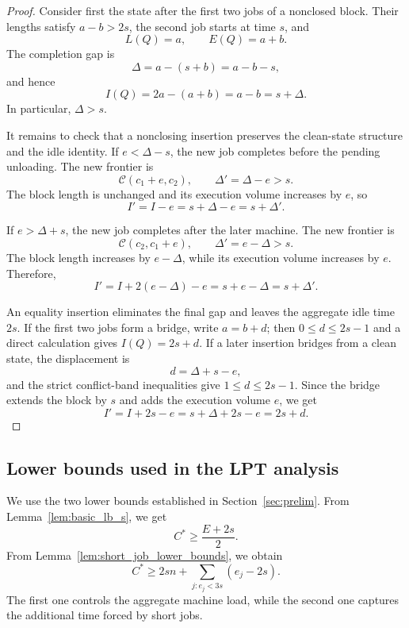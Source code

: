 \documentclass[11pt]{article}
\begin{document}
\begin{proof}
Consider first the state after the first two jobs of a nonclosed block. Their
lengths satisfy \(a-b>2s\), the second job starts at time \(s\), and
\[
L(Q)=a,\qquad E(Q)=a+b.
\]
The completion gap is
\[
\Delta=a-(s+b)=a-b-s,
\]
and hence
\[
I(Q)=2a-(a+b)=a-b=s+\Delta.
\]
In particular, \(\Delta>s\).

It remains to check that a nonclosing insertion preserves the clean-state
structure and the idle identity. If \(e<\Delta-s\), the new job completes
before the pending unloading. The new frontier is
\[
\mathcal C(c_1+e,c_2),
\qquad
\Delta'=\Delta-e>s.
\]
The block length is unchanged and its execution volume increases by \(e\), so
\[
I'=I-e=s+\Delta-e=s+\Delta'.
\]

If \(e>\Delta+s\), the new job completes after the later machine. The new
frontier is
\[
\mathcal C(c_2,c_1+e),
\qquad
\Delta'=e-\Delta>s.
\]
The block length increases by \(e-\Delta\), while its execution volume
increases by \(e\). Therefore,
\[
I'=I+2(e-\Delta)-e=s+e-\Delta=s+\Delta'.
\]

An equality insertion eliminates the final gap and leaves the aggregate idle time
\(2s\). If the first two jobs form a bridge, write \(a=b+d\); then
\(0\le d\le2s-1\) and a direct calculation gives \(I(Q)=2s+d\). If a later
insertion bridges from a clean state, the displacement is
\[
d=\Delta+s-e,
\]
and the strict conflict-band inequalities give \(1\le d\le2s-1\). Since the
bridge extends the block by \(s\) and adds the execution volume \(e\), we get
\[
I'=I+2s-e=s+\Delta+2s-e=2s+d.
\]
\end{proof}

\subsection{Lower bounds used in the LPT analysis}
\label{subsec:lpt-lower-bounds}

We use the two lower bounds established in Section~\ref{sec:prelim}. From
Lemma~\ref{lem:basic_lb_s}, we get
\begin{equation}
C^*\ge \frac{E+2s}{2}.
\label{eq:lpt-machine-lb}
\end{equation}
From Lemma~\ref{lem:short_job_lower_bounds}, we obtain 
\begin{equation}
C^*
\ge
2sn+\sum_{j:e_j<3s}(e_j-2s).
\label{eq:lpt-short-lb}
\end{equation}
The first one controls the aggregate machine load, while the second one captures the
additional time forced by short jobs.
\end{document}
